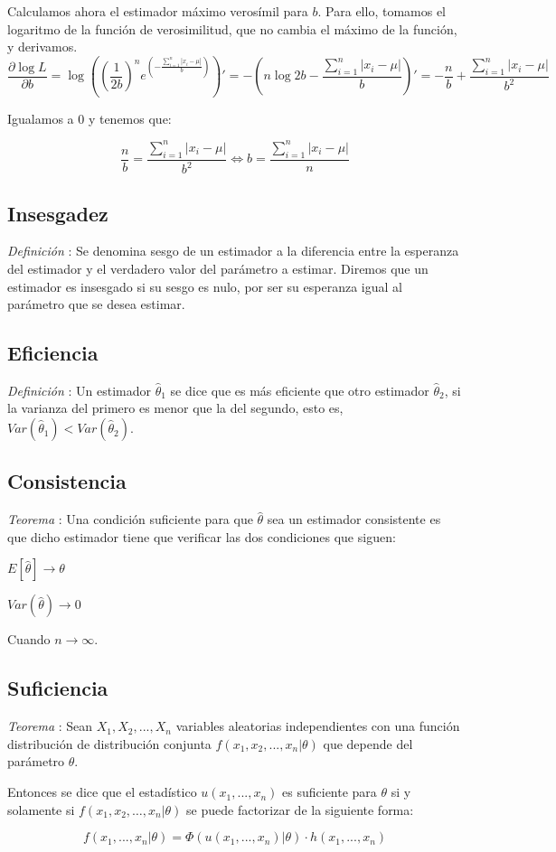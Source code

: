 \documentclass[a4paper, 10pt]{article} %
\newcounter{def}
\newcounter{teo}
\begin{document}
Calculamos ahora el estimador máximo verosímil para $b$. Para ello, tomamos el logaritmo de la función de verosimilitud, que no cambia el máximo de la función, y derivamos. 
$$\frac{\partial \log L}{\partial b} = \log \left(\left(\frac{1}{2b}\right)^n 
e^{\left(-\frac{\sum_{i=1}^{n}|x_i-\mu|}{b}\right)}\right)' = -\left(n\log 2b - \frac{\sum_{i=1}^{n}|x_i - \mu|}{b}\right)' = 
-\frac{n}{b} + \frac{\sum_{i=1}^{n}|x_i - \mu|}{b^2}$$

Igualamos a 0 y tenemos que: 

$$\frac{n}{b} = \frac{\sum_{i=1}^{n}|x_i - \mu|}{b^2} \iff b = \frac{\sum_{i=1}^{n}|x_i - \mu|}{n}$$


\subsection{Insesgadez}
\addtocounter{def}{1}
\emph{Definición }: Se denomina sesgo de un estimador a la diferencia entre la esperanza del estimador
y el verdadero valor del parámetro a estimar. Diremos que un estimador es insesgado si su sesgo es nulo, por ser
su esperanza igual al parámetro que se desea estimar.

\subsection{Eficiencia}
\addtocounter{def}{1}
\emph{Definición }: Un estimador $\hat{\theta}_1$ se dice que es más eficiente que otro estimador
$\hat{\theta}_2$, si la varianza del primero es menor que la del segundo, esto es,  $Var(\hat{\theta}_1)<Var(\hat{\theta}_2)$.

\subsection{Consistencia}
\addtocounter{teo}{1}
\emph{Teorema }: Una condición suficiente para que $\hat{\theta}$ sea un estimador consistente es que
dicho estimador tiene que verificar las dos condiciones que siguen:

\begin{description}
	\item $E[\hat{\theta}] \rightarrow \theta$
	\item $Var(\hat{\theta}) \rightarrow 0$
\end{description}

Cuando $n \rightarrow \infty$.

\subsection{Suficiencia}
\emph{Teorema }: Sean $X_1, X_2, ..., X_n$ variables aleatorias independientes con una función
distribución de distribución conjunta $f(x_1, x_2, ..., x_n | \theta)$ que depende del parámetro $\theta$.

Entonces se dice que el estadístico $u(x_1, ..., x_n)$ es suficiente para $\theta$ si y solamente si
$f(x_1, x_2,\dots, x_n | \theta)$ se puede factorizar de la siguiente forma:

$$ f(x_1,...,x_n| \theta) = \Phi(u(x_1, ..., x_n) | \theta)\cdot h(x_1, ..., x_n) $$
\end{document}
